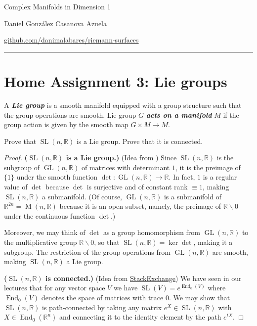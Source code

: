 \documentclass{article}
\newcommand{\R}{\mathbb{R}}
\DeclareMathOperator{\End}{End}
\DeclareMathOperator{\GL}{GL}
\DeclareMathOperator{\SL}{SL}
\DeclareMathOperator{\M}{M}
\begin{document}
\begin{minipage}{\textwidth}
	\begin{minipage}{.5\textwidth}
		Complex Manifolds in Dimension 1\\
	\end{minipage}%
	\begin{minipage}{.5\textwidth}
		\raggedleft
		Daniel González Casanova Azuela\par
		{\small\href{https://github.com/danimalabares/riemann-surfaces}{github.com/danimalabares/riemann-surfaces}}
	\end{minipage}%
\end{minipage}\vspace{.2cm}\hrule
\section{Home Assignment 3: Lie groups}
\setcounter{section}{3}
\begin{defn}
	A \textit{\textbf{Lie group}} is a smooth manifold equipped with a group structure such that the group operations are smooth. Lie group $G$ \textbf{\textit{acts on a manifold}} $M$ if the group action is given by the smooth map $G \times M \to M$.
\end{defn}
\begin{exercise}
	Prove that $\SL(n,\R)$ is a Lie group. Prove that it is connected.
\end{exercise}
\begin{proof}\leavevmode
	
	\textbf{($\SL(n,\R)$ is a Lie group.)} (Idea from \cite{lee}) Since $\SL(n,\R)$ is the subgroup of $\GL(n,\R)$ of matrices with determinant $1$, it is the preimage of $\{1\}$ under the smooth function $\det:\GL(n,\R)\to\R$. In fact, $1$ is a regular value of $\det$ because $\det$ is surjective and of constant rank $\equiv1$, making $\SL(n,\R)$ a submanifold. (Of course, $\GL(n,\R)$ is a submanifold of $\R^{2n}=\M(n,\R)$ because it is an open subset, namely, the preimage of $\R\backslash0$ under the continuous function $\det$.)
	
	Moreover, we may think of $\det$ as a group homomorphism from $\GL(n,\R)$ to the multiplicative group $\R\backslash0$, so that $\SL(n,\R)=\ker\det$, making it a subgroup. The restriction of the group operations from $\GL(n,\R)$ are smooth, making $\SL(n,\R)$ a Lie group.
	
	\textbf{($\SL(n,\R)$ is connected.)} (Idea from \href{https://math.stackexchange.com/questions/4774964/prove-that-operatornamesln-bbb-r-is-connected-using-the-decomposition}{StackExchange}) We have seen in our lectures that for any vector space $V$ we have $\SL(V)=e^{\End_0(V)}$ where $\End_0(V)$ denotes the space of matrices with trace 0. We may show that $\SL(n,\R)$ is path-connected by taking any matrix $e^{X}\in\SL(n,\R)$ with $X\in\End_0(\R^n)$ and connecting it to the identity element by the path $e^{tX}$.
\end{proof}
\end{document}
